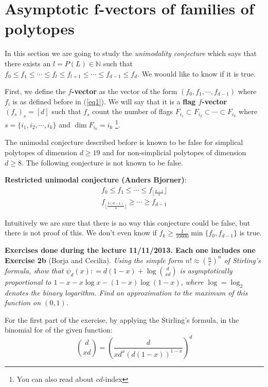 \chapter{Asymptotic f-vectors of families of polytopes}


In this section we are going to study the \textit{unimodality conjecture} which says that there exists an $l = P(L)\in\mathbb{N}$ such that $f_0\leq f_1 \leq \cdots\leq f_l \leq f_{l+1}\leq \cdots \leq f_{d-1}\leq f_d$. We woould like to know if it is true. 

First, we define the \textbf{$f$-vector} as the vector of the form $(f_0,f_{1},\cdots,f_{d-1})$ where $f_i$ is as defined before in (\ref{eq1}). We will say that it is a \textbf{flag $f$-vector} $(f_s)_s = [d]$ such that $f_s$ count the number of flags $F_{i_1} \subset F_{i_2} \subset \cdots \subset F_{i_k}$ where $s = \{i_1,i_2,\cdots, i_k \}$ and $\dim F_{i_k} = i_k$ \footnote{You can also read about $cd$-index}.

\bigskip
The unimodal conjecture described before is known to be false for simplical polytopes of dimension $d\geq 19$ and for non-simplicial polytopes of dimension $d \geq 8$. The following conjecture is not known to be false. 

\textbf{Restricted unimodal conjecture (Anders Bjorner)}: 
\begin{eqnarray*}
 f_0\leq f_1\leq \cdots \leq f_{\lfloor \frac{d-1}{4}}\rfloor\\
 f_{\lfloor \frac{3(d-1)}{4}\rfloor}\geq \cdots \geq f_{d-1}
\end{eqnarray*} 

Intuitively we are sure that there is no way this conjecture could be false, but there is not proof of this. We don't even know if $f_k\geq \frac{1}{10000}\min\{f_0,f_{d-1}\}$ is true.

\bigskip

\textbf{Exercises done during the lecture 11/11/2013. Each one includes one}
\textbf{Exercise 2b} (Borja and Cecilia). \textit{Using the simple form $n!\approx \left(\frac{n}{e}\right)^n$ of Stirling's formula, show that $\psi_d(x) : = d(1-x)+ \log  \binom {d} {xd}$ is asymptotically proportional to $1-x-x\log x - (1-x)\log(1-x)$, where  $\log = \log_2$ denotes the binary logarithm. Find an approximation to the maximum of this function on $(0,1)$}.

\bigskip
For the first part of the exercise, by applying the Stirling's formula, in the binomial for of the given function:
\[\binom{d}{xd} = \left(\frac{d}{xd^x (d(1-x))^{1-x}}\right)^d\]

